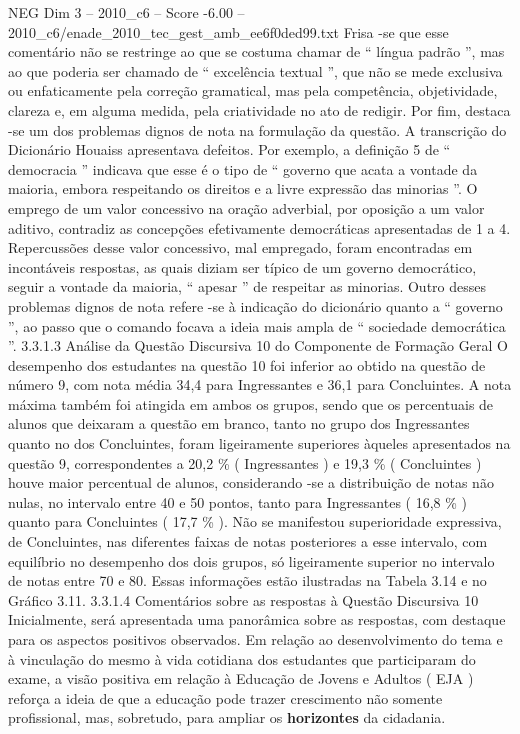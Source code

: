 \begin{textsample}{NEG Dim 3 – 2010\_c6 – Score -6.00 – 2010\_c6/enade\_2010\_tec\_gest\_amb\_ee6f0ded99.txt}
Frisa -se que esse comentário não se restringe ao que se costuma chamar de “ língua padrão ”, mas ao que poderia ser chamado de “ excelência textual ”, que não se mede exclusiva ou enfaticamente pela correção gramatical, mas pela competência, objetividade, clareza e, em alguma medida, pela criatividade no ato de redigir.
Por fim, destaca -se um dos problemas dignos de nota na formulação da questão.
A transcrição do Dicionário Houaiss apresentava defeitos.
Por exemplo, a definição 5 de “ democracia ” indicava que esse é o tipo de “ governo que acata a vontade da maioria, embora respeitando os direitos e a livre expressão das minorias ”.
O emprego de um valor concessivo na oração adverbial, por oposição a um valor aditivo, contradiz as concepções efetivamente democráticas apresentadas de 1 a 4.
Repercussões desse valor concessivo, mal empregado, foram encontradas em incontáveis respostas, as quais diziam ser típico de um governo democrático, seguir a vontade da maioria, “ apesar ” de respeitar as minorias.
Outro desses problemas dignos de nota refere -se à indicação do dicionário quanto a “ governo ”, ao passo que o comando focava a ideia mais ampla de “ sociedade democrática ”. 3.3.1.3 Análise da Questão Discursiva 10 do Componente de Formação Geral O desempenho dos estudantes na questão 10 foi inferior ao obtido na questão de número 9, com nota média 34,4 para Ingressantes e 36,1 para Concluintes.
A nota máxima também foi atingida em ambos os grupos, sendo que os percentuais de alunos que deixaram a questão em branco, tanto no grupo dos Ingressantes quanto no dos Concluintes, foram ligeiramente superiores àqueles apresentados na questão 9, correspondentes a 20,2 \% ( Ingressantes ) e 19,3 \% ( Concluintes ) houve maior percentual de alunos, considerando -se a distribuição de notas não nulas, no intervalo entre 40 e 50 pontos, tanto para Ingressantes ( 16,8 \% ) quanto para Concluintes ( 17,7 \% ).
Não se manifestou superioridade expressiva, de Concluintes, nas diferentes faixas de notas posteriores a esse intervalo, com equilíbrio no desempenho dos dois grupos, só ligeiramente superior no intervalo de notas entre 70 e 80.
Essas informações estão ilustradas na Tabela 3.14 e no Gráfico 3.11. 3.3.1.4 Comentários sobre as respostas à Questão Discursiva 10 Inicialmente, será apresentada uma panorâmica sobre as respostas, com destaque para os aspectos positivos observados.
Em relação ao desenvolvimento do tema e à vinculação do mesmo à vida cotidiana dos estudantes que participaram do exame, a visão positiva em relação à Educação de Jovens e Adultos ( EJA ) reforça a ideia de que a educação pode trazer crescimento não somente profissional, mas, sobretudo, para ampliar os \textbf{horizontes} da cidadania.

\end{textsample}
